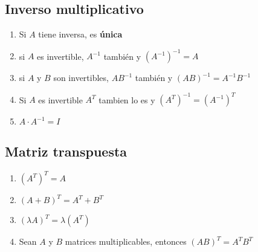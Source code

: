 \documentclass[]{article}
\begin{document}
\subsection{Inverso multiplicativo}
\begin{enumerate}
	\item Si $A$ tiene inversa, es \textbf{única}
	\item si $A$ es invertible, $A^{-1}$ también y $(A^{-1})^{-1}=A$
	\item si $A$ y $B$ son invertibles, $AB^{-1}$ también y $(AB)^{-1}=A^{-1}B^{-1}$
	\item Si $A$ es invertible $A^{T}$ tambien lo es y $(A^{T})^{-1}=(A^{-1})^{T}$
	\item $A \cdot A^{-1}=I$
\end{enumerate}

\subsection{Matriz transpuesta}
\begin{enumerate}
	\item $(A^{T})^{T}=A$
	\item $(A+B)^{T}=A^{T}+B^{T}$
	\item $(\lambda A)^{T}= \lambda (A^{T})$
	\item Sean $A$ y $B$ matrices multiplicables, entonces $(AB)^{T}=A^{T}B^{T}$
\end{enumerate}
\end{document}
